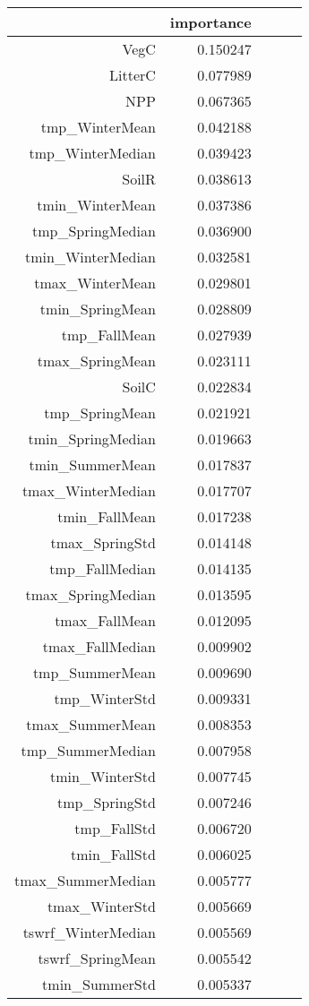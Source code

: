 \begin{tabular}{rrrrr}
\toprule
 & importance \\
\midrule
VegC & 0.150247 \\
LitterC & 0.077989 \\
NPP & 0.067365 \\
tmp_WinterMean & 0.042188 \\
tmp_WinterMedian & 0.039423 \\
SoilR & 0.038613 \\
tmin_WinterMean & 0.037386 \\
tmp_SpringMedian & 0.036900 \\
tmin_WinterMedian & 0.032581 \\
tmax_WinterMean & 0.029801 \\
tmin_SpringMean & 0.028809 \\
tmp_FallMean & 0.027939 \\
tmax_SpringMean & 0.023111 \\
SoilC & 0.022834 \\
tmp_SpringMean & 0.021921 \\
tmin_SpringMedian & 0.019663 \\
tmin_SummerMean & 0.017837 \\
tmax_WinterMedian & 0.017707 \\
tmin_FallMean & 0.017238 \\
tmax_SpringStd & 0.014148 \\
tmp_FallMedian & 0.014135 \\
tmax_SpringMedian & 0.013595 \\
tmax_FallMean & 0.012095 \\
tmax_FallMedian & 0.009902 \\
tmp_SummerMean & 0.009690 \\
tmp_WinterStd & 0.009331 \\
tmax_SummerMean & 0.008353 \\
tmp_SummerMedian & 0.007958 \\
tmin_WinterStd & 0.007745 \\
tmp_SpringStd & 0.007246 \\
tmp_FallStd & 0.006720 \\
tmin_FallStd & 0.006025 \\
tmax_SummerMedian & 0.005777 \\
tmax_WinterStd & 0.005669 \\
tswrf_WinterMedian & 0.005569 \\
tswrf_SpringMean & 0.005542 \\
tmin_SummerStd & 0.005337 \\

\end{tabular}

